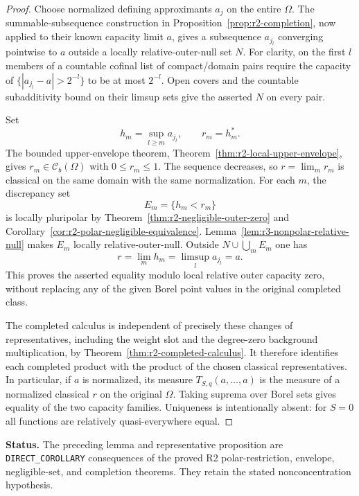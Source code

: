 \documentclass[11pt,a4paper]{article}
\numberwithin{equation}{section}
\theoremstyle{definition}
\theoremstyle{remark}
\newcommand{\Cb}{\mathcal C_b}
\begin{document}
\begin{proof}
Choose normalized defining approximants $a_j$ on the entire
$\Omega$. The summable-subsequence construction in
Proposition~\ref{prop:r2-completion}, now applied to their known
capacity limit $a$, gives a subsequence $a_{j_l}$ converging
pointwise to $a$ outside a locally relative-outer-null set $N$.
For clarity, on the first $l$ members of a countable cofinal
list of compact/domain pairs require the capacity of
$\{|a_{j_l}-a|>2^{-l}\}$ to be at most $2^{-l}$.
Open covers and the countable subadditivity bound on their
limsup sets give the asserted $N$ on every pair.

Set
\[
 h_m=\sup_{l\geq m}a_{j_l},\qquad r_m=h_m^*.
\]
The bounded upper-envelope theorem,
Theorem~\ref{thm:r2-local-upper-envelope}, gives
$r_m\in\Cb(\Omega)$ with $0\leq r_m\leq1$.
The sequence decreases, so
$r=\lim_m r_m$ is classical on the same domain with the same
normalization. For each $m$, the discrepancy set
\[
 E_m=\{h_m<r_m\}
\]
is locally pluripolar by
Theorem~\ref{thm:r2-negligible-outer-zero} and
Corollary~\ref{cor:r2-polar-negligible-equivalence}.
Lemma~\ref{lem:r3-nonpolar-relative-null} makes $E_m$ locally
relative-outer-null. Outside $N\cup\bigcup_mE_m$ one has
\[
 r=\lim_m h_m=\limsup_l a_{j_l}=a.
\]
This proves the asserted equality modulo local relative outer
capacity zero, without replacing any of the given Borel point
values in the original completed class.

The completed calculus is independent of precisely these
changes of representatives, including the weight slot and
the degree-zero background multiplication, by
Theorem~\ref{thm:r2-completed-calculus}. It therefore identifies
each completed product with the product of the chosen
classical representatives. In particular, if $a$ is normalized,
its measure $T_{S,q}(a,\ldots,a)$ is the measure of a normalized
classical $r$ on the original $\Omega$. Taking suprema over
Borel sets gives equality of the two capacity families.
Uniqueness is intentionally absent: for $S=0$ all functions
are relatively quasi-everywhere equal.
\end{proof}

\noindent\textbf{Status.}
The preceding lemma and representative proposition are
\texttt{DIRECT\_COROLLARY} consequences of the proved R2
polar-restriction, envelope, negligible-set, and completion
theorems. They retain the stated nonconcentration hypothesis.
\end{document}
